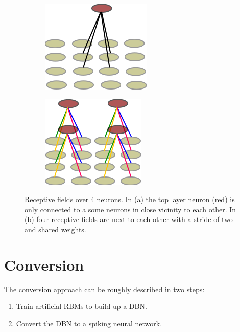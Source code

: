 \begin{figure}[h!]
	\centering
	\begin{subfigure}[t]{.4\textwidth}
  		\centering
  		\includegraphics[width=.5\linewidth]{imgs/recpt_field1.png}
  		\caption{}
  		\label{fig:receptfields1}
	\end{subfigure}%
	\begin{subfigure}[t]{.4\textwidth}
  		\centering
  		\includegraphics[width=.5\linewidth]{imgs/recpt_field2.png}
  		\caption{}
  		\label{fig:receptfields2}
	\end{subfigure}
	\caption[Receptive fields over 4 neurons.]{Receptive fields over 4 neurons. In (a) the top layer neuron (red) is only connected to a some neurons in close vicinity to each other. In (b) four receptive fields are next to each other with a stride of two and shared weights. }
	\label{fig:receptfields}
\end{figure}




\section{Conversion} \label{c:convappro}

The conversion approach can be roughly described in two steps:
\begin{enumerate}
\item Train artificial RBMs to build up a DBN.
\item Convert the DBN to a spiking neural network.
\end{enumerate}



